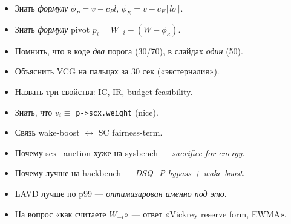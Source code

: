 \documentclass[11pt,a4paper]{article}
\begin{document}
\begin{itemize}[leftmargin=*]
  \item[$\square$] Знать \emph{формулу} $\phi_P=v-c_P l$, $\phi_E=v-c_E\lceil l\sigma\rceil$.
  \item[$\square$] Знать \emph{формулу} pivot $p_i=W_{-i}-(W-\phi_\kappa)$.
  \item[$\square$] Помнить, что в коде \emph{два} порога (30/70), в слайдах \emph{один} (50).
  \item[$\square$] Объяснить VCG на пальцах за 30 сек («экстерналия»).
  \item[$\square$] Назвать три свойства: IC, IR, budget feasibility.
  \item[$\square$] Знать, что $v_i \equiv$ \texttt{p->scx.weight} (nice).
  \item[$\square$] Связь wake-boost $\leftrightarrow$ $\mathrm{SC}$ fairness-term.
  \item[$\square$] Почему scx\_auction хуже на sysbench — \emph{sacrifice for energy}.
  \item[$\square$] Почему лучше на hackbench — \emph{DSQ\_P bypass + wake-boost}.
  \item[$\square$] LAVD лучше по p99 — \emph{оптимизирован именно под это}.
  \item[$\square$] На вопрос «как считаете $W_{-i}$» — ответ «Vickrey reserve form, EWMA».
\end{itemize}
\end{document}

